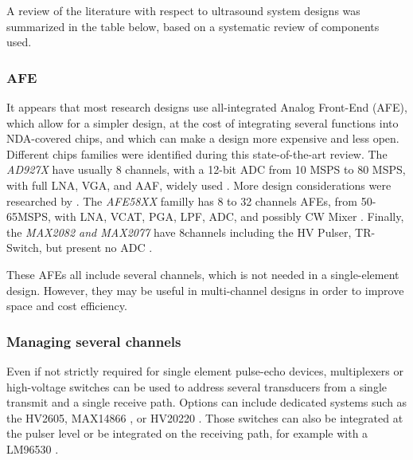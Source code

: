 \documentclass{article}
\begin{document}
A review of the literature with respect to ultrasound system designs was summarized in the table below, based on a systematic review of components used.



\subsubsection{AFE}

It appears that most research designs use all-integrated Analog Front-End (AFE), which allow for a simpler design, at the cost of integrating several functions into NDA-covered chips, and which can make a design more expensive and less open. Different chips families were identified during this state-of-the-art review. The \emph{AD927X} have usually 8 channels, with a 12-bit ADC from 10 MSPS to 80 MSPS, with full LNA, VGA, and AAF, widely used \cite{hewener_highly_2012,alqasemi_fpga-based_2012,di_ianni_system-level_2016,raj_programmable_2018,raj_microcontroller_2017,cheung_multi-channel_2012,alqasemi_fpga-based_2012,batbayar_hardware_2018,raj_8051_2016,li_new_2014,enwia_open-source_2019,techavipoo_ultrasound_2012,pashaei_flexible_2020,shomaji_early_2019,roman_open-source_2018}. More design considerations were researched by \cite{di_ianni_system-level_2016}.
The \emph{AFE58XX} familly has 8 to 32 channels AFEs, from 50-65MSPS, with LNA, VCAT, PGA, LPF, ADC, and possibly CW Mixer \cite{assef_flexible_2015,assef_design_2012,assef_compact_2014,assef_initial_2016,bharath_fpga-based_2015,bharath_novel_2016,lee_new_2014,hager_lightprobe:_2017,bharath_compact_2018,kidav_architecture_2019}. Finally, the \emph{MAX2082 and MAX2077} have 8channels including the HV Pulser, TR-Switch, but present no ADC \cite{hewener_mobile_2019,weng_fpga-based_2015}. 

These AFEs all include several channels, which is not needed in a single-element design. However, they may be useful in multi-channel designs in order to improve space and cost efficiency.

\subsubsection{Managing several channels}

Even if not strictly required for single element pulse-echo devices, multiplexers or high-voltage switches can be used to address several transducers from a single transmit and a single receive path. Options can include dedicated systems such as the HV2605, MAX14866 \cite{enwia_open-source_2019,pashaei_flexible_2020}, or HV20220 \cite{li_new_2014}. Those switches can also be integrated at the pulser level \cite{worthing_using_2016,hidayat_determination_2020} or be integrated on the receiving path, for example with a LM96530 \cite{gwirc_desarrollo_2019,vasudevan_programmable_2014,roman_open-source_2018}.
\end{document}

